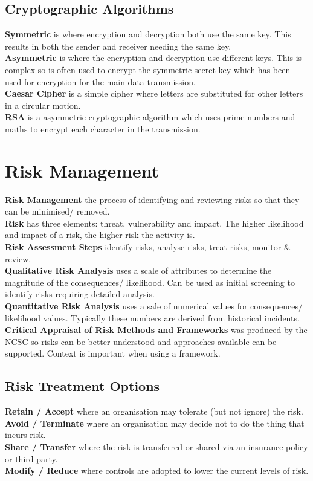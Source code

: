 \documentclass[a4paper,11pt]{article}
\begin{document}
\subsection{Cryptographic Algorithms}
\textbf{Symmetric} is where encryption and decryption both use the same key. This results in both the sender and receiver needing the same key.\\
\textbf{Asymmetric} is where the encryption and decryption use different keys. This is complex so is often used to encrypt the symmetric secret key which has been used for encryption for the main data transmission.\\
\textbf{Caesar Cipher} is a simple cipher where letters are substituted for other letters in a circular motion.\\
\textbf{RSA} is a asymmetric cryptographic algorithm which uses prime numbers and maths to encrypt each character in the transmission. 

\section{Risk Management}
\textbf{Risk Management} the process of identifying and reviewing risks so that they can be minimised/ removed.\\
\textbf{Risk} has three elements: threat, vulnerability and impact. The higher likelihood and impact of a risk, the higher risk the activity is.\\
\textbf{Risk Assessment Steps} identify risks, analyse risks, treat risks, monitor \& review.\\
\textbf{Qualitative Risk Analysis} uses a scale of attributes to determine the magnitude of the consequences/ likelihood. Can be used as initial screening to identify risks requiring detailed analysis.\\
\textbf{Quantitative Risk Analysis} uses a sale of numerical values for consequences/ likelihood values. Typically these numbers are derived from historical incidents.\\
\textbf{Critical Appraisal of Risk Methods and Frameworks} was produced by the NCSC so risks can be better understood and approaches available can be supported. Context is important when using a framework.
\subsection{Risk Treatment Options}
\textbf{Retain / Accept} where an organisation may tolerate (but not ignore) the risk.\\
\textbf{Avoid / Terminate} where an organisation may decide not to do the thing that incurs risk.\\
\textbf{Share / Transfer} where the risk is transferred or shared via an insurance policy or third party.\\
\textbf{Modify / Reduce} where controls are adopted to lower the current levels of risk.
\end{document}
